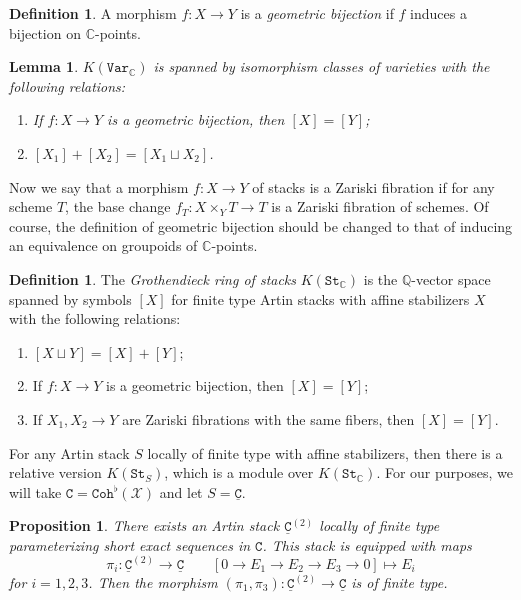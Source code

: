 \documentclass[leqno, openany]{memoir}
\newtheorem{prop}[thm]{Proposition}
\newtheorem{lem}[thm]{Lemma}
\theoremstyle{definition}
\newtheorem{defn}[thm]{Definition}
\theoremstyle{remark}
\theoremstyle{plain}
\theoremstyle{definition}
\theoremstyle{remark}
\newcommand{\C}{\mathbb{C}}
\newcommand{\Q}{\mathbb{Q}}
\newcommand{\mc}[1]{\mathcal{#1}}
\newcommand{\mt}[1]{\mathtt{#1}}
\newcommand{\ul}[1]{\underline{#1}}
\begin{document}
\begin{defn}
    A morphism $f \colon X \to Y$ is a \textit{geometric bijection} if $f$ induces a bijection on $\C$-points.
\end{defn}

\begin{lem}
    $K(\mt{Var}_{\C})$ is spanned by isomorphism classes of varieties with the following relations:
    \begin{enumerate}
        \item If $f \colon X \to Y$ is a geometric bijection, then $[X] = [Y]$;
        \item $[X_1] + [X_2] = [X_1 \sqcup X_2]$.
    \end{enumerate}
\end{lem}

Now we say that a morphism $f \colon X \to Y$ of stacks is a Zariski fibration if for any scheme $T$, the base change $f_T \colon X \times_{Y} T \to T$ is a Zariski fibration of schemes. Of course, the definition of geometric bijection should be changed to that of inducing an equivalence on groupoids of $\C$-points.

\begin{defn}
    The \textit{Grothendieck ring of stacks} $K(\mt{St}_{\C})$ is the $\Q$-vector space spanned by symbols $[X]$ for finite type Artin stacks with affine stabilizers $X$ with the following relations:
    \begin{enumerate}
        \item $[X \sqcup Y] = [X] + [Y]$;
        \item If $f \colon X \to Y$ is a geometric bijection, then $[X] = [Y]$;
        \item If $X_1, X_2 \to Y$ are Zariski fibrations with the same fibers, then $[X] = [Y]$.
    \end{enumerate}
\end{defn}
For any Artin stack $S$ locally of finite type with affine stabilizers, then there is a relative version $K(\mt{St}_S)$, which is a module over $K(\mt{St}_{\C})$. For our purposes, we will take $\mt{C} = \mt{Coh}^{\flat}(\mc{X})$ and let $S = \mt{\ul{C}}$. 

\begin{prop}
    There exists an Artin stack $\mt{\ul{C}}^{(2)}$ locally of finite type parameterizing short exact sequences in $\mt{C}$. This stack is equipped with maps
    \[ \pi_i \colon \mt{\ul{C}}^{(2)} \to \mt{\ul{C}} \qquad [0 \to E_1 \to E_2 \to E_3 \to 0] \mapsto E_i \]
    for $i = 1,2,3$. Then the morphism $(\pi_1, \pi_3) \colon \mt{\ul{C}}^{(2)} \to \mt{\ul{C}}$ is of finite type.
\end{prop}
\end{document}
